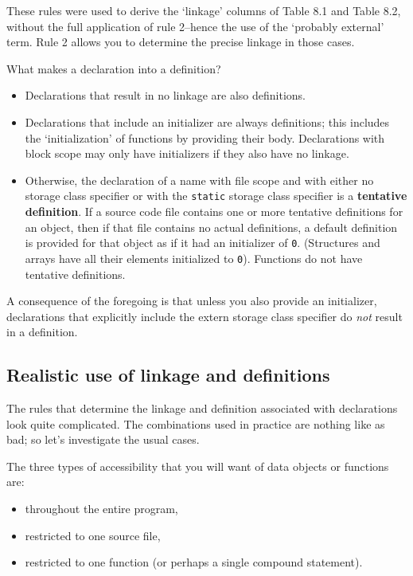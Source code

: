    These rules were used to derive the `linkage' columns of
    Table 8.1 and Table 8.2, without the full
    application of rule 2--hence the use of the `probably
    external' term. Rule 2 allows you to determine the precise linkage in
    those cases.


   What makes a declaration into a definition?


   \begin{itemize}
    \item Declarations that result in no linkage are also definitions.

    \item Declarations that include an initializer are always definitions;
     this includes the `initialization' of functions by providing their
     body. Declarations with block scope may only have initializers if
     they also have no linkage.

    \item Otherwise, the declaration of a name with file scope and with
     either no storage class specifier or with the \texttt{static}
     storage class specifier is a \textbf{tentative definition}. If
     a source code file contains one or more tentative definitions for
     an object, then if that file contains no actual definitions, a
     default definition is provided for that object as if it had an
     initializer of \texttt{0}. (Structures and arrays have
     all their elements initialized to \texttt{0}). Functions
     do not have tentative definitions.
   \end{itemize}

   A consequence of the foregoing is that unless you also provide an
    initializer, declarations that explicitly include the extern storage
    class specifier do \textit{not} result in a definition.


  

  \subsection{Realistic use of linkage and definitions}
   

   The rules that determine the linkage and definition associated with
    declarations look quite complicated. The combinations used in practice
    are nothing like as bad; so let's investigate the usual cases.


   The three types of accessibility that you will want of data objects or
    functions are:


   \begin{itemize}
    \item throughout the entire program,

    \item restricted to one source file,

    \item restricted to one function (or perhaps a single compound
     statement).
   \end{itemize}

